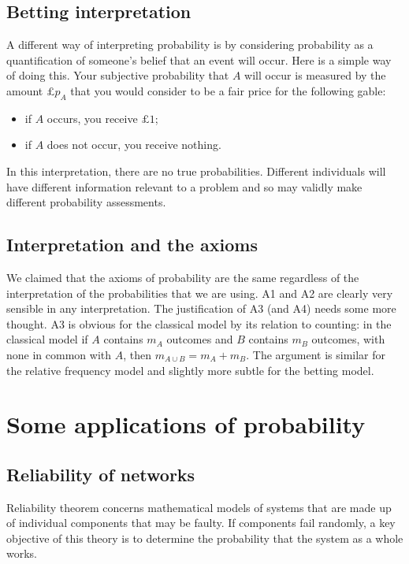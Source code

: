\documentclass[10pt, a4paper]{article}
\begin{document}
\subsection{Betting interpretation}
A different way of interpreting probability is by considering probability as a quantification of someone's belief that an event will occur.
Here is a simple way of doing this.
Your subjective probability that $A$ will occur is measured by the amount 
$\pounds p_A$ that you would consider to be a fair price for the following gable:
\begin{itemize}
    \item if $A$ occurs, you receive $\pounds1$;
    \item if $A$ does not occur, you receive nothing.
\end{itemize}
In this interpretation,
there are no true probabilities.
Different individuals will have different information relevant to a problem
and so may validly make different probability assessments.

\subsection{Interpretation and the axioms}
We claimed that the axioms of probability are the same regardless of the interpretation of the probabilities that we are using.
A1 and A2 are clearly very sensible in any interpretation.
The justification of A3 (and A4) needs some more thought.
A3 is obvious for the classical model by its relation to counting:
in the classical model if $A$ contains $m_A$ outcomes and $B$ contains $m_B$ outcomes,
with none in common with $A$,
then $m_{A \cup B} = m_A + m_B$.
The argument is similar for the relative frequency model and slightly more subtle for the betting model.

\newpage

\section{Some applications of probability}

\subsection{Reliability of networks}
Reliability theorem concerns mathematical models of systems that are made up of individual components that may be faulty.
If components fail randomly,
a key objective of this theory is to determine the probability that the system as a whole works.
\end{document}
